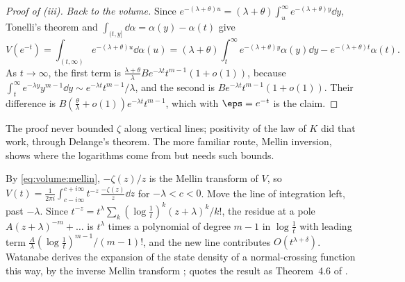 \begin{refsection}
\begin{proof}[Proof of (iii)]
\emph{Back to the volume.} Since $e^{-(\lambda+\theta)u}=(\lambda+\theta)\int_u^\infty e^{-(\lambda+\theta)y}\dd y$, Tonelli's theorem and $\int_{(t,y]}\dd\alpha=\alpha(y)-\alpha(t)$ give
\[
V(e^{-t})=\int_{(t,\infty)}e^{-(\lambda+\theta)u}\dd\alpha(u)=(\lambda+\theta)\int_t^\infty e^{-(\lambda+\theta)y}\alpha(y)\dd y-e^{-(\lambda+\theta)t}\alpha(t).
\]
As $t\to\infty$, the first term is $\frac{\lambda+\theta}\lambda Be^{-\lambda t}t^{m-1}(1+o(1))$, because $\int_t^\infty e^{-\lambda y}y^{m-1}\dd y\sim e^{-\lambda t}t^{m-1}/\lambda$, and the second is $Be^{-\lambda t}t^{m-1}(1+o(1))$. Their difference is $B(\frac\theta\lambda+o(1))e^{-\lambda t}t^{m-1}$, which with $\eps=e^{-t}$ is the claim.
\end{proof}

The proof never bounded $\zeta$ along vertical lines; positivity of the law of $K$ did that work, through Delange's theorem. The more familiar route, Mellin inversion, shows where the logarithms come from but needs such bounds.

\begin{heuristic}
By \eqref{eq:volume:mellin}, $-\zeta(z)/z$ is the Mellin transform of $V$, so $V(t)=\frac1{2\pi i}\int_{c-i\infty}^{c+i\infty}t^{-z}\,\frac{-\zeta(z)}z\dd z$ for $-\lambda<c<0$. Move the line of integration left, past $-\lambda$. Since $t^{-z}=t^\lambda\sum_k(\log\frac1t)^k(z+\lambda)^k/k!$, the residue at a pole $A(z+\lambda)^{-m}+\dots$ is $t^\lambda$ times a polynomial of degree $m-1$ in $\log\frac1t$ with leading term $\frac A\lambda(\log\frac1t)^{m-1}/(m-1)!$, and the new line contributes $O(t^{\lambda+\delta})$. Watanabe derives the expansion of the state density of a normal-crossing function this way, by the inverse Mellin transform \parencite[\S4.1]{Watanabe2024}; \textcite[Lemma~4]{Watanabe2013} quotes the result as Theorem~4.6 of \textcite{Watanabe2009}.
\end{heuristic}


\end{refsection}
